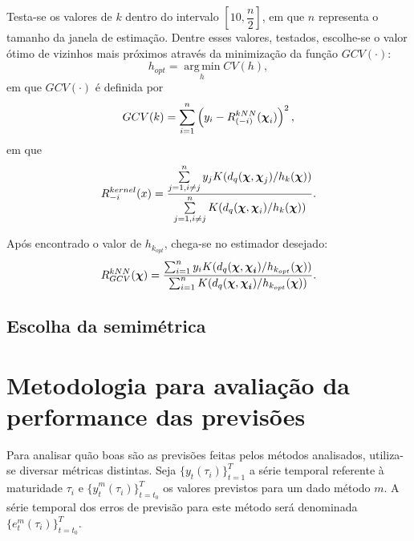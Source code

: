 \documentclass[
	12pt,				%
	openright,			%
	oneside,			%
	a4paper,			%
	english,			%
	brazil				%
	]{dissertacao-ufrgs-abntex2}
\begin{document}
\begin{description}
Testa-se os valores de $k$ dentro do intervalo $[10,\dfrac{n}{2}]$, em que $n$ representa o tamanho da janela de estimação. Dentre esses valores, testados, escolhe-se o valor ótimo de vizinhos mais próximos através da minimização da função $GCV(\cdot)$:
\[h_{opt} = \operatorname*{arg\,min}_h CV(h),\]
em que $GCV(\cdot)$ é definida por
\[
GCV(k) = \sum \limits_{i=1}^n \left(  y_i - R_{(-i)}^{kNN}(\boldsymbol{\chi}_i)  \right)^2, 
\]
em que
\[
R_{-i}^{kernel}(x)=\frac{\sum \limits_{j=1,i \neq j}^{n}y_{j}K(d_{q}(\boldsymbol{\chi},\boldsymbol{\chi}_{j})/h_k(\boldsymbol{\chi}))}{\sum \limits_{j=1,i \neq j}^{n}K(d_{q}(\boldsymbol{\chi},\boldsymbol{\chi}_{i})/h_k(\boldsymbol{\chi}))}.
\]


Após encontrado o valor de $h_{k_{opt}}$, chega-se no estimador desejado:
\[
R_{GCV}^{kNN}(\boldsymbol{\chi})=\dfrac{\sum_{i=1}^{n}y_{i}K(d_{q}(\boldsymbol{\chi},\boldsymbol{\boldsymbol{\chi}_{i}})/h_{k_{opt}}(\boldsymbol{\chi}))}{\sum_{i=1}^{n}K(d_{q}(\boldsymbol{\chi},\boldsymbol{\boldsymbol{\chi}_{i}})/h_{k_{opt}}(\boldsymbol{\chi}))}.
\]


\end{description}


\subsection{Escolha da semimétrica}


\section{Metodologia para avaliação da performance das previsões}

Para analisar quão boas são as previsões feitas pelos métodos analisados, utiliza-se diversar métricas distintas. Seja $\{y_{t}(\tau_i)\}_{t=1}^T$ a série temporal referente à maturidade $\tau_i$ e $\{\hat{y}_{t}^m(\tau_i)\}_{t=t_0}^T$ os valores previstos para um dado método $m$. A série temporal dos erros de previsão para este método será denominada $\{e_{t}^m(\tau_i)\}_{t=t_0}^T$.
\end{document}
